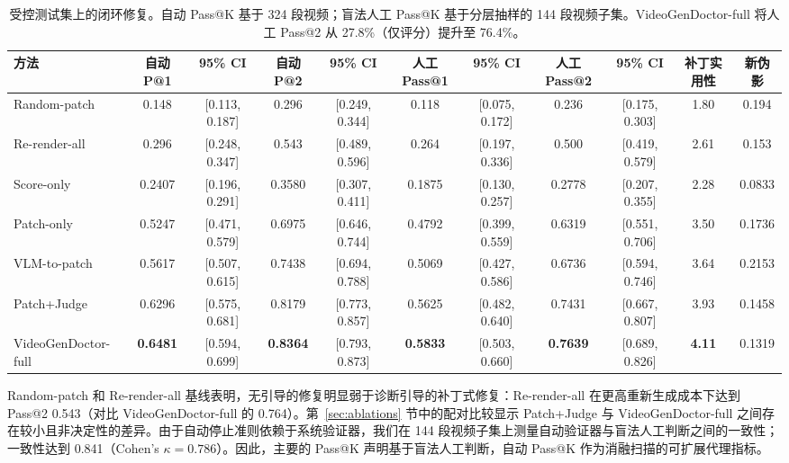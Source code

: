 \documentclass{article}
\newcommand{\VerifierHumanAgreement}{0.841}
\newcommand{\VerifierHumanKappa}{0.786}
\begin{document}
\begin{table}[t]
\centering\scriptsize
\caption{受控测试集上的闭环修复。自动 Pass@K 基于 324 段视频；盲法人工 Pass@K 基于分层抽样的 144 段视频子集。VideoGenDoctor-full 将人工 Pass@2 从 27.8\%（仅评分）提升至 76.4\%。}
\label{tab:closed_loop_repair}
\begin{adjustbox}{max width=\textwidth}
\begin{tabular}{lcccccccccc}
\toprule
\textbf{方法} & \textbf{自动 P@1} & \textbf{95\% CI} & \textbf{自动 P@2} & \textbf{95\% CI} & \textbf{人工 Pass@1} & \textbf{95\% CI} & \textbf{人工 Pass@2} & \textbf{95\% CI} & \textbf{补丁实用性} & \textbf{新伪影} \\
\midrule
Random-patch & 0.148 & [0.113, 0.187] & 0.296 & [0.249, 0.344] & 0.118 & [0.075, 0.172] & 0.236 & [0.175, 0.303] & 1.80 & 0.194 \\
Re-render-all & 0.296 & [0.248, 0.347] & 0.543 & [0.489, 0.596] & 0.264 & [0.197, 0.336] & 0.500 & [0.419, 0.579] & 2.61 & 0.153 \\
Score-only & 0.2407 & [0.196, 0.291] & 0.3580 & [0.307, 0.411] & 0.1875 & [0.130, 0.257] & 0.2778 & [0.207, 0.355] & 2.28 & 0.0833 \\
Patch-only & 0.5247 & [0.471, 0.579] & 0.6975 & [0.646, 0.744] & 0.4792 & [0.399, 0.559] & 0.6319 & [0.551, 0.706] & 3.50 & 0.1736 \\
VLM-to-patch & 0.5617 & [0.507, 0.615] & 0.7438 & [0.694, 0.788] & 0.5069 & [0.427, 0.586] & 0.6736 & [0.594, 0.746] & 3.64 & 0.2153 \\
Patch+Judge & 0.6296 & [0.575, 0.681] & 0.8179 & [0.773, 0.857] & 0.5625 & [0.482, 0.640] & 0.7431 & [0.667, 0.807] & 3.93 & 0.1458 \\
VideoGenDoctor-full & \textbf{0.6481} & [0.594, 0.699] & \textbf{0.8364} & [0.793, 0.873] & \textbf{0.5833} & [0.503, 0.660] & \textbf{0.7639} & [0.689, 0.826] & \textbf{4.11} & 0.1319 \\
\bottomrule
\end{tabular}
\end{adjustbox}
\end{table}

Random-patch 和 Re-render-all 基线表明，无引导的修复明显弱于诊断引导的补丁式修复：Re-render-all 在更高重新生成成本下达到 Pass@2 0.543（对比 VideoGenDoctor-full 的 0.764）。第~\ref{sec:ablations} 节中的配对比较显示 Patch+Judge 与 VideoGenDoctor-full 之间存在较小且非决定性的差异。由于自动停止准则依赖于系统验证器，我们在 144 段视频子集上测量自动验证器与盲法人工判断之间的一致性；一致性达到 \VerifierHumanAgreement{}（Cohen's $\kappa = \VerifierHumanKappa$）。因此，主要的 Pass@K 声明基于盲法人工判断，自动 Pass@K 作为消融扫描的可扩展代理指标。
\end{document}
